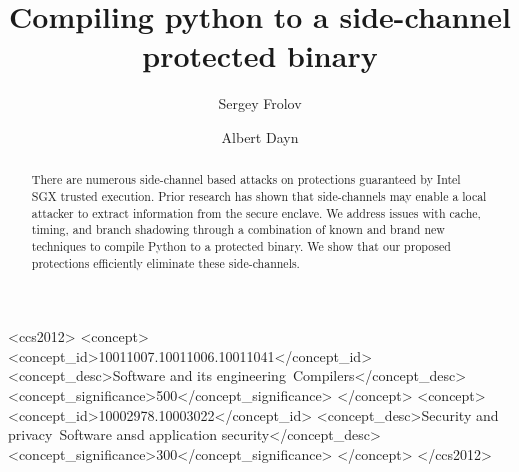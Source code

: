 \documentclass[sigplan, review]{acmart}
\begin{document}
\title{Compiling python to a side-channel protected binary}

\author{Sergey Frolov}

\author{Albert Dayn}



\begin{abstract}
There are numerous side-channel based attacks on protections guaranteed by Intel SGX trusted execution. Prior research has shown that side-channels may enable a local attacker to extract information from the secure enclave. We address issues with cache, timing, and branch shadowing through a combination of known and brand new techniques to compile Python to a protected binary. We show that our proposed protections efficiently eliminate these side-channels.
\end{abstract}

%
%
\begin{CCSXML}
<ccs2012>
<concept>
<concept_id>10011007.10011006.10011041</concept_id>
<concept_desc>Software and its engineering~Compilers</concept_desc>
<concept_significance>500</concept_significance>
</concept>
<concept>
<concept_id>10002978.10003022</concept_id>
<concept_desc>Security and privacy~Software ansd application security</concept_desc>
<concept_significance>300</concept_significance>
</concept>
</ccs2012>
\end{CCSXML}




\maketitle
\end{document}

